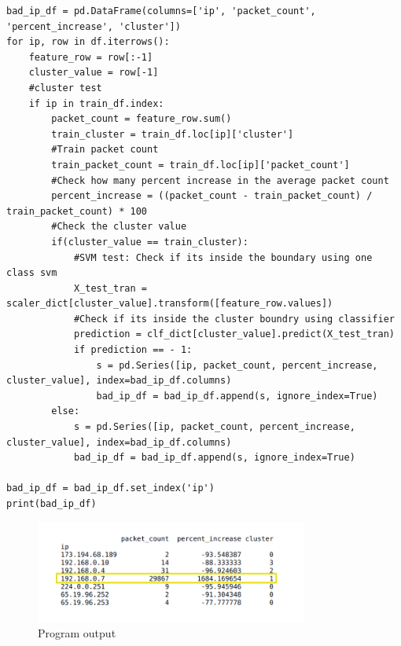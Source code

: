 \documentclass{article}
\begin{document}
\begin{verbatim}
bad_ip_df = pd.DataFrame(columns=['ip', 'packet_count', 'percent_increase', 'cluster'])
for ip, row in df.iterrows():
    feature_row = row[:-1]
    cluster_value = row[-1]
    #cluster test
    if ip in train_df.index:
        packet_count = feature_row.sum()
        train_cluster = train_df.loc[ip]['cluster']
        #Train packet count
        train_packet_count = train_df.loc[ip]['packet_count']
        #Check how many percent increase in the average packet count
        percent_increase = ((packet_count - train_packet_count) / train_packet_count) * 100
        #Check the cluster value
        if(cluster_value == train_cluster):
            #SVM test: Check if its inside the boundary using one class svm
            X_test_tran = scaler_dict[cluster_value].transform([feature_row.values])
            #Check if its inside the cluster boundry using classifier
            prediction = clf_dict[cluster_value].predict(X_test_tran)
            if prediction == - 1:
                s = pd.Series([ip, packet_count, percent_increase, cluster_value], index=bad_ip_df.columns)
                bad_ip_df = bad_ip_df.append(s, ignore_index=True)
        else:
            s = pd.Series([ip, packet_count, percent_increase, cluster_value], index=bad_ip_df.columns)
            bad_ip_df = bad_ip_df.append(s, ignore_index=True)

bad_ip_df = bad_ip_df.set_index('ip')
print(bad_ip_df)
\end{verbatim}
\begin{figure}[H]
\centering
\includegraphics[width=0.80\textwidth]{detected_IP.png}
\caption{Program output} \label{fig:detected_IP}
\end{figure}
\end{document}
